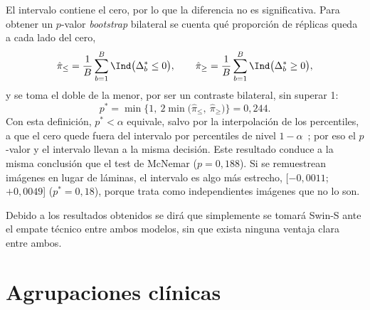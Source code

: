 El intervalo contiene el cero, por lo que la diferencia no es significativa. Para obtener un $p$-valor \emph{bootstrap} bilateral se cuenta qué proporción de réplicas queda a cada lado del cero,
\[
  \hat\pi_{\le} = \frac{1}{B} \sum_{b=1}^{B} \Ind\bigl(\Delta^{*}_{b} \le 0\bigr), \qquad
  \hat\pi_{\ge} = \frac{1}{B} \sum_{b=1}^{B} \Ind\bigl(\Delta^{*}_{b} \ge 0\bigr),
\]
y se toma el doble de la menor, por ser un contraste bilateral, sin superar 1:
\[
  p^{*} = \min\bigl\{1,\ 2 \min\bigl(\hat\pi_{\le},\ \hat\pi_{\ge}\bigr)\bigr\} = 0{,}244.
\]
Con esta definición, $p^{*} < \alpha$ equivale, salvo por la interpolación de los percentiles, a que el cero quede fuera del intervalo por percentiles de nivel $1 - \alpha$~\cite{pena2008fundamentos}; por eso el $p$-valor y el intervalo llevan a la misma decisión. Este resultado conduce a la misma conclusión que el test de McNemar ($p = 0{,}188$). Si se remuestrean imágenes en lugar de láminas, el intervalo es algo más estrecho, [$-0{,}0011$; $+0{,}0049$] ($p^{*} = 0{,}18$), porque trata como independientes imágenes que no lo son.

Debido a los resultados obtenidos se dirá que simplemente se tomará Swin-S ante el empate técnico entre ambos modelos, sin que exista ninguna ventaja
clara entre ambos.


\section{Agrupaciones clínicas}\label{sec:agrupaciones}


